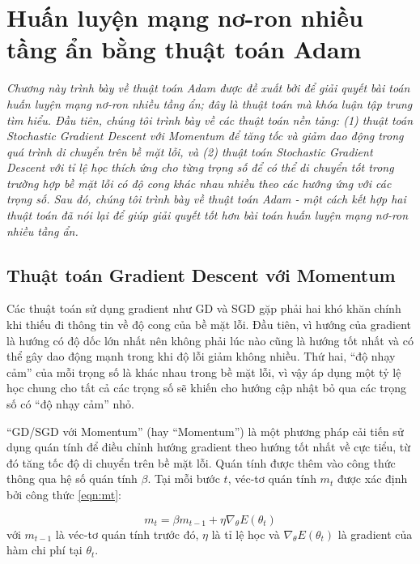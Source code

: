 \chapter{Huấn luyện mạng nơ-ron nhiều tầng ẩn bằng thuật toán Adam}
\label{Chapter3}

\textit{Chương này trình bày về thuật toán Adam được đề xuất bởi \cite{kingma2014adam} để giải quyết bài toán huấn luyện mạng nơ-ron nhiều tầng ẩn; đây là thuật toán mà khóa luận tập trung tìm hiểu. Đầu tiên, chúng tôi trình bày về các thuật toán nền tảng: (1) thuật toán Stochastic Gradient Descent với Momentum để tăng tốc và giảm dao động trong quá trình di chuyển trên bề mặt lỗi, và (2) thuật toán Stochastic Gradient Descent với tỉ lệ học thích ứng cho từng trọng số để có thể di chuyển tốt trong trường hợp bề mặt lỗi có độ cong khác nhau nhiều theo các hướng ứng với các trọng số. Sau đó, chúng tôi trình bày về thuật toán Adam - một cách kết hợp hai thuật toán đã nói lại để giúp giải quyết tốt hơn bài toán huấn luyện mạng nơ-ron nhiều tầng ẩn.}

\section{Thuật toán Gradient Descent với Momentum}

Các thuật toán sử dụng gradient như GD và SGD gặp phải hai khó khăn chính khi thiếu đi thông tin về độ cong của bề mặt lỗi. Đầu tiên, vì hướng của gradient là hướng có độ dốc lớn nhất nên không phải lúc nào cũng là hướng tốt nhất và có thể gây dao động mạnh trong khi độ lỗi giảm không nhiều. Thứ hai, ``độ nhạy cảm'' của mỗi trọng số là khác nhau trong bề mặt lỗi, vì vậy áp dụng một tỷ lệ học chung cho tất cả các trọng số sẽ khiến cho hướng cập nhật bỏ qua các trọng số có ``độ nhạy cảm'' nhỏ.

``GD/SGD với Momentum'' (hay ``Momentum'') là một phương pháp cải tiến sử dụng quán tính để điều chỉnh hướng gradient theo hướng tốt nhất về cực tiểu, từ đó tăng tốc độ di chuyển trên bề mặt lỗi. Quán tính được thêm vào công thức thông qua hệ số quán tính $\beta$. Tại mỗi bước $t$, véc-tơ quán tính $m_t$ được xác định bởi công thức \ref{eqn:mt}:

\begin{equation}
	\label{eqn:mt}
	m_t = \beta m_{t-1} + \eta\nabla_\theta E(\theta_t)
\end{equation}
với $m_{t-1}$ là véc-tơ quán tính trước đó, $\eta$ là tỉ lệ học và $\nabla_\theta E(\theta_t)$ là gradient của hàm chi phí tại $\theta_t$.

